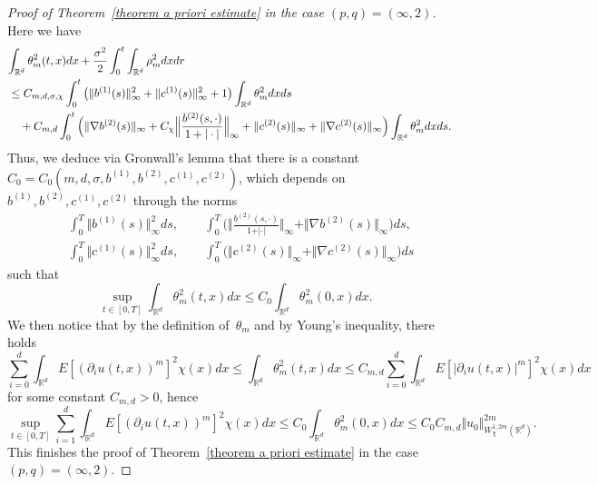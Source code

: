 \documentclass[a4paper,10pt]{article}
\newcommand\1{\mathbbm{1}}
\numberwithin{equation}{section}
\begin{document}
\begin{proof}[Proof of Theorem~\ref{theorem a priori estimate} in the case
$(p,q)=(\infty,2)$] Here we have
\begin{align*}
\lefteqn{ \int_{\mathbb{R}^{d}}\theta_{m}^{2}(t,x)dx+\frac{\sigma^{2}}{2}\int_{0} 
^{t}\int_{\mathbb{R}^{d}}\rho_{m}^{2}dxdr }\\
&  \leq C_{m,d,\sigma,\chi}\int_{0}^{t} \big(\Vert b^{(1)}(s) \Vert_{\infty}^{2}+\Vert c^{(1)}(s)  \Vert_{\infty}^{2} +1 \big)  \int_{\mathbb{R}^{d}}\theta_{m}^{2}dxds\\
& \quad {} +C_{m,d}\int_{0}^{t} \Big( \Vert \nabla b^{(2)}(s) \Vert_{\infty} +C_{\chi} \Big\Vert \frac{b^{(2)}(s,\cdot)}{1+\vert \cdot\vert }\Big\Vert
_{\infty}+ \Vert c^{(2)}(s)  \Vert_{\infty}+ \Vert \nabla c^{(2)}(s) \Vert_{\infty} \Big)  \int_{\mathbb{R}^{d}} \theta_{m}^{2}dxds .
\end{align*}
Thus, we deduce via Gronwall's lemma that there is a constant $C_{0} 
=C_{0}(m,d,\sigma,b^{(1)  },b^{(2)
},c^{(1)  },c^{(2)  })$, which depends on
$b^{(1)  },b^{(2)  },c^{(1)
},c^{(2)  }$ through the norms 
\begin{align*}
&  \int_{0}^{T} \Vert b^{(1)}(s) \Vert_{\infty}^{2}ds ,\qquad \int_{0}^{T} \Big( \Big\Vert \frac{b^{(2)}(s,\cdot) }{1+\vert \cdot\vert
}\Big\Vert_{\infty}+\Vert \nabla b^{(2)}(s) \Vert_{\infty} \Big)  ds,\\
&  \int_{0}^{T} \Vert c^{(1)}(s)  \Vert_{\infty}^{2} ds , \qquad \int_{0}^{T}\big(\Vert c^{(2)}(s)  \Vert _{\infty}+ \Vert \nabla c^{(2)}(s) \Vert_{\infty} \big)  ds
\end{align*}
such that
\begin{equation}
\sup_{t\in [  0,T]  }\int_{\mathbb{R}^{d}}\theta_{m}^{2}(t,x)dx\leq
C_{0}\int_{\mathbb{R}^{d}}\theta_{m}^{2}(0,x)dx.\label{final bound on theta} 
\end{equation}
We then notice that by the definition of~$\theta_m$ and by Young's inequality, there holds
\begin{equation*}
\sum_{i=0}^{d}\int_{\mathbb{R}^{d}}E[(\partial_{i}u(t,x))
^{m}]^{2}\chi(x)  dx\leq\int_{\mathbb{R}^{d}}\theta
_{m}^{2}(t,x)dx\leq C_{m,d}\sum_{i=0}^{d}\int_{\mathbb{R}^{d}}E[
\vert \partial_{i}u(t,x)\vert ^{m}]^{2}\chi(x)  dx
\end{equation*}
for some constant $C_{m,d}>0$, hence
\begin{equation*}
\sup_{t\in[0,T]} \sum_{i=1}^{d}\int_{\mathbb{R}^{d}}E[(\partial_{i}u(t,x))^{m}]^{2} \chi(x)
dx\leq C_{0}\int_{\mathbb{R}^{d}}\theta_{m}^{2}(0,x)dx\leq C_{0} 
C_{m,d}\Vert u_{0}\Vert_{W_{\chi}^{1,2m}(\mathbb{R}^{d})}^{2m}.
\end{equation*}
This finishes the proof of Theorem~\ref{theorem a priori estimate} in the case $(p,q)=(\infty,2)$.
\end{proof}
\end{document}
